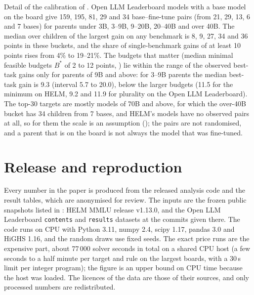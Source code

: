 Detail of the calibration of . Open LLM Leaderboard models with a base model on the board give 159, 195, 81, 29 and 34 base--fine-tune pairs (from 21, 29, 13, 6 and 7 bases) for parents under 3B, 3--9B, 9--20B, 20--40B and over 40B. The median over children of the largest gain on any benchmark is 8, 9, 27, 34 and 36 points in these buckets, and the share of single-benchmark gains of at least 10 points rises from 4\% to 19--21\%. The budgets that matter (median minimal feasible budgets $B^\ast$ of 2 to 12 points, ) lie within the range of the observed best-task gains only for parents of 9B and above: for 3--9B parents the median best-task gain is 9.3 (interval 5.7 to 20.0), below the larger budgets (11.5 for the minimum on HELM, 9.2 and 11.9 for plurality on the Open LLM Leaderboard). The top-30 targets are mostly models of 70B and above, for which the over-40B bucket has 34 children from 7 bases, and HELM's models have no observed pairs at all, so for them the scale is an assumption (); the pairs are not randomised, and a parent that is on the board is not always the model that was fine-tuned.

\section{Release and reproduction}
\label{app:release}

Every number in the paper is produced from the released analysis code and the result tables, which are anonymised for review. The inputs are the frozen public snapshots listed in : HELM MMLU release v1.13.0, and the Open LLM Leaderboard \texttt{contents} and \texttt{results} datasets at the commits given there. The code runs on CPU with Python 3.11, numpy 2.4, scipy 1.17, pandas 3.0 and HiGHS 1.16, and the random draws use fixed seeds. The exact price runs are the expensive part, about 77\,000 solver seconds in total on a shared CPU host (a few seconds to a half minute per target and rule on the largest boards, with a 30\,s limit per integer program); the figure is an upper bound on CPU time because the host was loaded. The licences of the data are those of their sources, and only processed numbers are redistributed.
